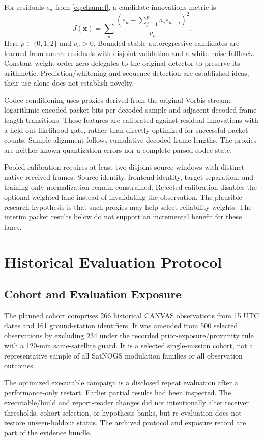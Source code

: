 \documentclass{ieeeaccess}
\begin{document}
For residuals $e_n$ from \eqref{eq:channel}, a candidate innovations metric is
\begin{equation}
J(\boldsymbol{x})=\sum_n\frac{\left(e_n-\sum_{j=1}^{p}a_j e_{n-j}\right)^2}{v_n}.
\label{eq:innovation}
\end{equation}
Here $p\in\{0,1,2\}$ and $v_n>0$. Bounded stable autoregressive candidates are learned from source residuals with disjoint validation and a white-noise fallback. Constant-weight order zero delegates to the original detector to preserve its arithmetic. Prediction/whitening and sequence detection are established ideas; their use alone does not establish novelty.

Codec conditioning uses proxies derived from the original Vorbis stream: logarithmic encoded-packet bits per decoded sample and adjacent decoded-frame length transitions. These features are calibrated against residual innovations with a held-out likelihood gate, rather than directly optimized for successful packet counts. Sample alignment follows cumulative decoded-frame lengths. The proxies are neither known quantization errors nor a complete parsed codec state.

Pooled calibration requires at least two disjoint source windows with distinct native received frames. Source identity, frontend identity, target separation, and training-only normalization remain constrained. Rejected calibration disables the optional weighted lane instead of invalidating the observation. The plausible research hypothesis is that such proxies may help select reliability weights. The interim packet results below do not support an incremental benefit for these lanes.

\section{Historical Evaluation Protocol}
\subsection{Cohort and Evaluation Exposure}
The planned cohort comprises 266 historical CANVAS observations from 15 UTC dates and 161 ground-station identifiers. It was amended from 500 selected observations by excluding 234 under the recorded prior-exposure/proximity rule with a 120-min same-satellite guard. It is a selected single-mission cohort, not a representative sample of all SatNOGS modulation families or all observation outcomes.

The optimized executable campaign is a disclosed repeat evaluation after a performance-only restart. Earlier partial results had been inspected. The executable/build and report-reader changes did not intentionally alter receiver thresholds, cohort selection, or hypothesis banks, but re-evaluation does not restore unseen-holdout status. The archived protocol and exposure record are part of the evidence bundle.
\end{document}

